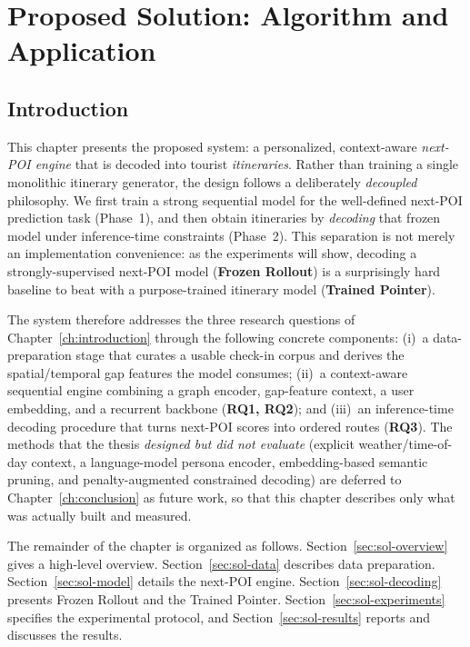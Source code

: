 \chapter{Proposed Solution: Algorithm and Application}
\label{ch:solution}

\section{Introduction}
\label{sec:sol-intro}

This chapter presents the proposed system: a personalized, context-aware
\emph{next-POI engine} that is decoded into tourist \emph{itineraries}. Rather than
training a single monolithic itinerary generator, the design follows a deliberately
\emph{decoupled} philosophy. We first train a strong sequential model for the well-defined
next-POI prediction task (Phase~1), and then obtain itineraries by \emph{decoding} that
frozen model under inference-time constraints (Phase~2). This separation is not merely an
implementation convenience: as the experiments will show, decoding a strongly-supervised
next-POI model (\textbf{Frozen Rollout}) is a surprisingly hard baseline to beat with a
purpose-trained itinerary model (\textbf{Trained Pointer}).

The system therefore addresses the three research questions of Chapter~\ref{ch:introduction}
through the following concrete components: (i)~a data-preparation stage that curates a usable
check-in corpus and derives the spatial/temporal gap features the model consumes; (ii)~a
context-aware sequential engine combining a graph encoder, gap-feature context, a user
embedding, and a recurrent backbone (\textbf{RQ1, RQ2}); and (iii)~an inference-time decoding
procedure that turns next-POI scores into ordered routes (\textbf{RQ3}). The methods that the
thesis \emph{designed but did not evaluate} (explicit weather/time-of-day context, a
language-model persona encoder, embedding-based semantic pruning, and penalty-augmented
constrained decoding) are deferred to Chapter~\ref{ch:conclusion} as future work, so that this
chapter describes only what was actually built and measured.

The remainder of the chapter is organized as follows.
Section~\ref{sec:sol-overview} gives a high-level overview.
Section~\ref{sec:sol-data} describes data preparation.
Section~\ref{sec:sol-model} details the next-POI engine.
Section~\ref{sec:sol-decoding} presents Frozen Rollout and the Trained Pointer.
Section~\ref{sec:sol-experiments} specifies the experimental protocol, and
Section~\ref{sec:sol-results} reports and discusses the results.

